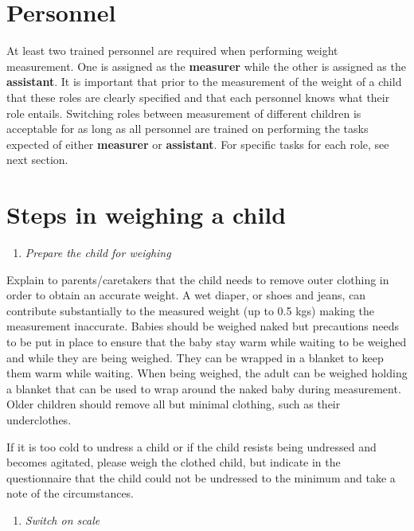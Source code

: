 \documentclass[12pt,]{book}
\providecommand{\tightlist}{%
  \setlength{\itemsep}{0pt}\setlength{\parskip}{0pt}}
\begin{document}
\hypertarget{personnel}{%
\section{Personnel}\label{personnel}}

At least two trained personnel are required when performing weight
measurement. One is assigned as the \textbf{measurer} while the other is
assigned as the \textbf{assistant}. It is important that prior to the
measurement of the weight of a child that these roles are clearly
specified and that each personnel knows what their role entails.
Switching roles between measurement of different children is acceptable
for as long as all personnel are trained on performing the tasks
expected of either \textbf{measurer} or \textbf{assistant}. For specific
tasks for each role, see next section.

\hypertarget{steps-in-weighing-a-child}{%
\section{Steps in weighing a child}\label{steps-in-weighing-a-child}}

\begin{enumerate}
\def\labelenumi{\arabic{enumi}.}
\tightlist
\item
  \emph{Prepare the child for weighing}
\end{enumerate}

Explain to parents/caretakers that the child needs to remove outer
clothing in order to obtain an accurate weight. A wet diaper, or shoes
and jeans, can contribute substantially to the measured weight (up to
0.5 kgs) making the measurement inaccurate. Babies should be weighed
naked but precautions needs to be put in place to ensure that the baby
stay warm while waiting to be weighed and while they are being weighed.
They can be wrapped in a blanket to keep them warm while waiting. When
being weighed, the adult can be weighed holding a blanket that can be
used to wrap around the naked baby during measurement. Older children
should remove all but minimal clothing, such as their underclothes.

If it is too cold to undress a child or if the child resists being
undressed and becomes agitated, please weigh the clothed child, but
indicate in the questionnaire that the child could not be undressed to
the minimum and take a note of the circumstances.

\begin{enumerate}
\def\labelenumi{\arabic{enumi}.}
\setcounter{enumi}{1}
\tightlist
\item
  \emph{Switch on scale}
\end{enumerate}
\end{document}
